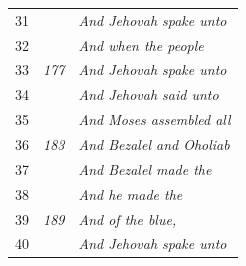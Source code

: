 \documentclass{article}
\newlength{\minipageheight}
\newlength{\minipagewidth}
\begin{document}
\begin{minipage}[r][\minipageheight][t]{\minipagewidth}
\begin{longtable}{ccl}
        31          &              & \textit{And Jehovah spake unto}   \\
        32          &              & \textit{And when the people}      \\
        33          & \textit{177} & \textit{And Jehovah spake unto}   \\
        34          &              & \textit{And Jehovah said unto}    \\
        35          &              & \textit{And Moses assembled all}  \\
        36          & \textit{183} & \textit{And Bezalel and Oholiab}  \\
        37          &              & \textit{And Bezalel made the}     \\
        38          &              & \textit{And he made the}          \\
        39          & \textit{189} & \textit{And of the blue,}         \\
        40          &              & \textit{And Jehovah spake unto}   \\


\end{longtable}
\end{minipage}
\end{document}
